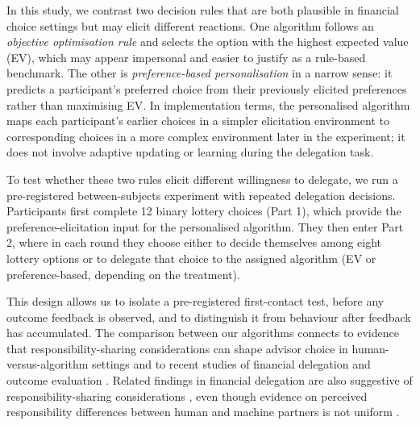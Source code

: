 \documentclass[a4paper, 12pt, fleqn]{article}
\theoremstyle{hypstyle}
\begin{document}
In this study, we contrast two decision rules that are both plausible in financial choice settings but may elicit different reactions. One algorithm follows an \emph{objective optimisation rule} and selects the option with the highest expected value (EV), which may appear impersonal and easier to justify as a rule-based benchmark. The other is \emph{preference-based personalisation} in a narrow sense: it predicts a participant's preferred choice from their previously elicited preferences rather than maximising EV. In implementation terms, the personalised algorithm maps each participant's earlier choices in a simpler elicitation environment to corresponding choices in a more complex environment later in the experiment; it does not involve adaptive updating or learning during the delegation task.

To test whether these two rules elicit different willingness to delegate, we run a pre-registered between-subjects experiment with repeated delegation decisions. Participants first complete 12 binary lottery choices (Part 1), which provide the preference-elicitation input for the personalised algorithm. They then enter Part 2, where in each round they choose either to decide themselves among eight lottery options or to delegate that choice to the assigned algorithm (EV or preference-based, depending on the treatment). 

This design allows us to isolate a pre-registered first-contact test, before any outcome feedback is observed, and to distinguish it from behaviour after feedback has accumulated. 
The comparison between our algorithms connects to evidence that responsibility-sharing considerations can shape advisor choice in human-versus-algorithm settings \citep{Gazit2023} and to recent studies of financial delegation and outcome evaluation \citep{Ismagilova2025}. Related findings in financial delegation are also suggestive of responsibility-sharing considerations \citep{Werner2026}, even though evidence on perceived responsibility differences between human and machine partners is not uniform \citep{Gazit2023,Kirchkamp2019}.
\end{document}
